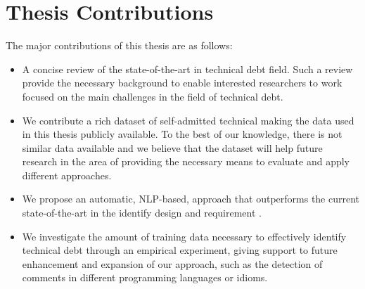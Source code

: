 \section{Thesis Contributions}

The major contributions of this thesis are as follows:
\begin{itemize}

\item A concise review of the state-of-the-art in technical debt field. Such a review provide the necessary background to enable interested researchers to work focused on the main challenges in the field of technical debt. 

\item We contribute a rich dataset of self-admitted technical making the data used in this thesis publicly available. To the best of our knowledge, there is not similar data available and we believe that the dataset will help future research in the area of \SATD providing the necessary means to evaluate and apply different approaches.

\item We propose an automatic, NLP-based, approach that outperforms the current state-of-the-art in the identify design and requirement \SATD. 

\item We investigate the amount of training data necessary to effectively identify technical debt through an empirical experiment, giving support to future enhancement and expansion of our approach, such as the detection of \SATD comments in different programming languages or idioms.

\end{itemize}